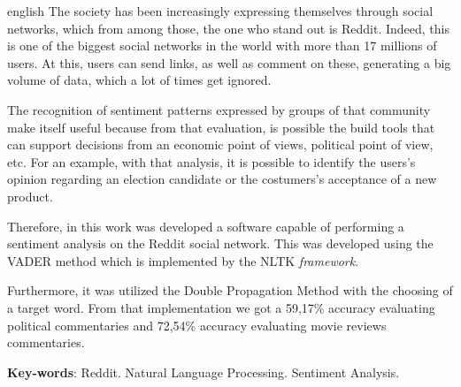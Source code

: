 \begin{resumo}[Abstract]
 \begin{otherlanguage*}{english}
   The society has been increasingly expressing themselves through social networks,
which from among those, the one who stand out is Reddit. Indeed, this is one of
the biggest social networks in the world with more than 17 millions of users. At
this, users can send links, as well as comment on these, generating a big volume
of data, which a lot of times get ignored.

The recognition of sentiment patterns expressed by groups of that community
make itself useful because from that evaluation, is possible the build tools
that can support decisions from an economic point of views, political
point of view, etc. For an example, with that
analysis, it is possible to identify the users's opinion regarding an election candidate or the costumers's acceptance of a new product.

Therefore, in this work was developed a software capable of performing a
sentiment analysis on the Reddit social network. This was developed using
the \ac{VADER} method which is implemented by the \ac{NLTK} \textit{framework}.

Furthermore, it was utilized the Double Propagation Method with the choosing of
a target word. From that implementation we got a 59,17\% accuracy evaluating
political commentaries and 72,54\% accuracy evaluating movie reviews
commentaries. 

   \vspace{\onelineskip}
 
   \noindent 
   \textbf{Key-words}: Reddit. Natural Language Processing. Sentiment
Analysis.
 \end{otherlanguage*}
\end{resumo}